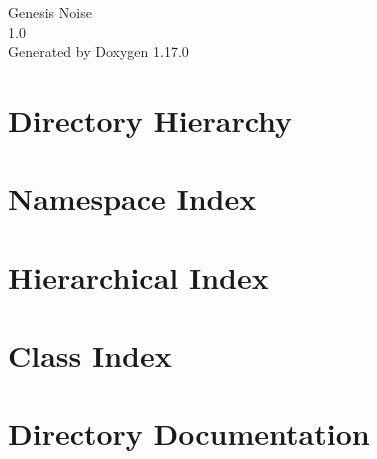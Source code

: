 \documentclass[twoside]{book}
\newcommand{\+}{\discretionary{\mbox{\scriptsize$\hookleftarrow$}}{}{}}
\newcommand{\clearemptydoublepage}{%
    \newpage{\pagestyle{empty}\cleardoublepage}%
  }
\begin{document}
  \raggedbottom
    \hypersetup{pageanchor=false,
                bookmarksnumbered=true,
                pdfencoding=unicode
               }
  \begin{titlepage}
  \vspace*{7cm}
  \begin{center}%
  {\Large Genesis Noise}\\
  [1ex]\large 1.\+0 \\
  \vspace*{1cm}
  {\large Generated by Doxygen 1.17.0}\\
  \end{center}
  \end{titlepage}
  \clearemptydoublepage
  \tableofcontents
  \clearemptydoublepage
  \hypersetup{pageanchor=true}

\chapter{Directory Hierarchy}

\chapter{Namespace Index}

\chapter{Hierarchical Index}

\chapter{Class Index}

\chapter{Directory Documentation}



\end{document}
